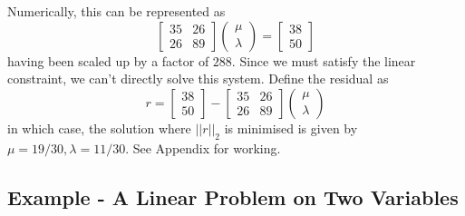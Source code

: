 Numerically, this can be represented as
\begin{equation*}
    \begin{bmatrix}
        35 & 26 \\
        26 & 89
    \end{bmatrix} \begin{pmatrix}
        \mu \\
        \lambda
    \end{pmatrix} = \begin{bmatrix}
        38 \\
        50
    \end{bmatrix}
\end{equation*}
having been scaled up by a factor of $288$.
Since we must satisfy the linear constraint, we can't directly solve this system.
Define the residual as
\begin{equation*}
    r = \begin{bmatrix}
        38 \\
        50
    \end{bmatrix} - \begin{bmatrix}
        35 & 26 \\
        26 & 89
    \end{bmatrix} \begin{pmatrix}
        \mu \\
        \lambda
    \end{pmatrix}
\end{equation*}
in which case, the solution where $||r||_2$ is minimised is given by $\mu = 19/30, \lambda = 11/30$.
See Appendix for working.


\subsection{Example - A Linear Problem on Two Variables}

